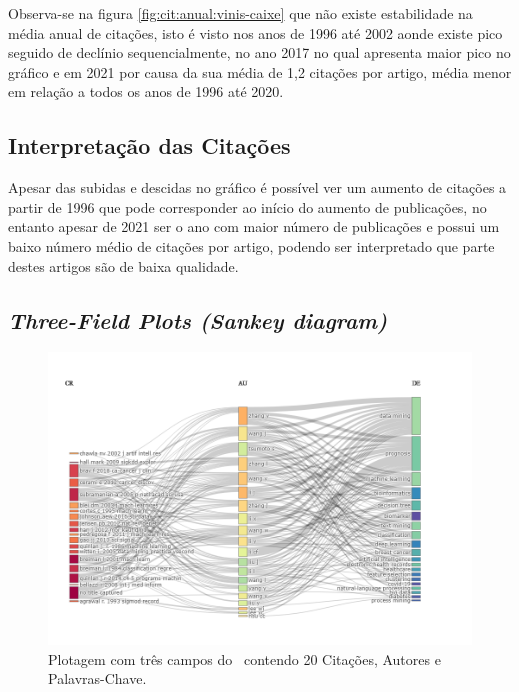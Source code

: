 Observa-se na figura \ref{fig:cit:anual:vinis-caixe} que não existe estabilidade na média anual de citações, isto é visto nos anos de 1996 até 2002 aonde existe pico seguido de declínio sequencialmente, no ano 2017 no qual apresenta maior pico no gráfico e em 2021 por causa da sua média de 1,2 citações por artigo, média menor em relação a todos os anos de 1996 até 2020.

\subsection{Interpretação das Citações}

Apesar das subidas e descidas no gráfico é possível ver um aumento de citações a partir de 1996 que pode corresponder ao início do aumento de publicações, no entanto apesar de 2021 ser o ano com maior número de publicações e possui um baixo número médio de citações por artigo, podendo ser interpretado que parte destes artigos são de baixa qualidade.

\subsection{\textit{Three-Field Plots (Sankey diagram)}}

\begin{figure}
    \centering
    \includegraphics[width=1\textwidth]{experiments/vinis-caixe/PesqBibliogr/MineracaoDados/WoS-20220204/Dataset/ThreeFieldPlot-2022-02-09.png}
    \caption{Plotagem com três campos do \dataset\ contendo 20 Citações, Autores e Palavras-Chave.}
    \label{fig:cit:plot:vinis-caixe}
\end{figure}

